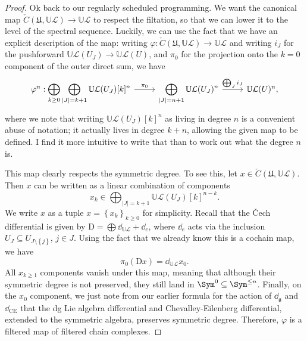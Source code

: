 \begin{proof}
	Ok back to our regularly scheduled programming. We want the canonical map $\check{C}(\mathfrak{U} ,\mathbb{U} \mathcal{L} )\to \mathbb{U} \mathcal{L} $ to respect the filtation, so that we can lower it to the level of the spectral sequence. Luckily, we can use the fact that we have an explicit description of the map: writing $\varphi : \check{C}(\mathfrak{U} ,\mathbb{U} \mathcal{L} ) \to \mathbb{U} \mathcal{L} $ and writing $i_J$ for the pushforward $\mathbb{U} \mathcal{L} (U_J)\to \mathbb{U} \mathcal{L} (U)$, and $\pi _0$ for the projection onto the $k=0$ component of the outer direct sum, we have
	\[\begin{tikzcd}[row sep = 2.5em, column sep = 2.5em]
		\varphi^n : \displaystyle{\bigoplus_{k\geq 0} \bigoplus_{\left| J \right| =k+1} \mathbb{U} \mathcal{L} (U_J)[k]^n}\ar[" \pi _0 ", r]  & \displaystyle{\bigoplus_{\left| J \right| =n+1} \mathbb{U} \mathcal{L} (U_J)^n}\ar[" \bigoplus_{J} i_J ", r]  & \mathbb{U} \mathcal{L} (U)^n,
	\end{tikzcd}\]
	where we note that writing $\mathbb{U} \mathcal{L} (U_J)[k]^n$ as living in degree $n$ is a convenient abuse of notation; it actually lives in degree $k+n$, allowing the given map to be defined. I find it more intuitive to write that than to work out what the degree $n$ is.

	This map clearly respects the symmetric degree. To see this, let $x\in\check{C}(\mathfrak{U} ,\mathbb{U} \mathcal{L} )$. Then $x$ can be written as a linear combination of components
	\[
		x_k\in \bigoplus_{\left| J \right| =k+1} \mathbb{U} \mathcal{L}(U_J)[k]^{n-k}
	.\]
	We write $x$ as a tuple $x = \left\{ x_k \right\}_{k\geq 0} $ for simplicity. Recall that the \v{C}ech differential is given by $\mathrm{D} =\bigoplus\dd _{\mathbb{U} \mathcal{L} } +\dd _e$, where $\dd _e$ acts via the inclusion $U_J \subseteq U_{J\setminus \left\{ j \right\} } $, $j\in J$. Using the fact that we already know this is a cochain map, we have
	\[
		\pi_0(\mathrm{D} x)  = \dd _{\mathbb{U} \mathcal{L} } x_0
	.\]
	All $x_{k\geq 1} $ components vanish under this map, meaning that although their symmetric degree is not preserved, they still land in $\Sym ^0 \subseteq \Sym ^{\leq n} $. Finally, on the $x_0$ component, we just note from our earlier formula for the action of $\dd _{\mathfrak{g} } $ and $\dd _{\mathrm{CE} } $ that the dg Lie algebra differential and Chevalley-Eilenberg differential, extended to the symmetric algebra, preserves symmetric degree. Therefore, $\varphi $ is a filtered map of filtered chain complexes.


\end{proof}
